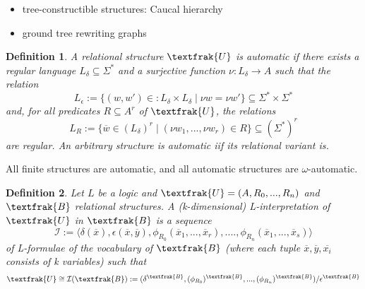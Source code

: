 \documentclass[]{article}
\newtheorem{definition}{Definition}
\newtheorem{theorem}{Theorem}
\begin{document}
\begin{itemize}
        they form a proper subclass of automatic structures that generalizes various notions of infinite graphs. Examples: context free graphs (= configuration graphs of PDA), HR- and VR-equational graphs, prefix-recognizable graphs.
        \begin{theorem}
            For any graph $G=(V,(E_a)_{a\in A})$ the followign are equivalent: 
            (1) G is tree-interpretable,
            (2) G is prefix-recognizable,
            (3) G is VR-equational,
            (4) G is the restriction to a regular set of the configuration graph of a PDA with $\epsilon$-transitions.
        \end{theorem}
    \item tree-constructible structures: Caucal hierarchy
    \item ground tree rewriting graphs 
\end{itemize}
\begin{definition}
    A relational structure $\textfrak{U}$ is automatic if there exists a regular language $L_\delta \subseteq \Sigma^*$ and a surjective function $\nu : L_\delta \rightarrow A$ such that the relation 
    \begin{equation}
        L_\epsilon := \{(w, w')\in :L_\delta \times L_\delta\;|\;\nu w = \nu w'\}\subseteq \Sigma^* \times \Sigma^*
    \end{equation}
    and, for all predicates $R\subseteq A^r$ of $\textfrak{U}$, the relations 
    \begin{equation}
        L_R := \{\overline{w}\in (L_\delta)^r\;|\;(\nu w_1,...,\nu w_r)\in R\}\subseteq (\Sigma^*)^r
    \end{equation}
    are regular. An arbitrary structure is automatic iif its relational variant is. 
\end{definition}
All finite structures are automatic, and all automatic structures are $\omega$-automatic.
\begin{definition}
    Let $L$ be a logic and $\textfrak{U}=(A, R_0,..., R_n)$ and $\textfrak{B}$ relational structures. A (k-dimensional) L-interpretation of $\textfrak{U}$ in $\textfrak{B}$ is a sequence
    \begin{equation}
        \mathcal{I} := \langle \delta(\overline{x}), \epsilon(\overline{x}, \overline{y}), \phi_{R_0}(\overline{x}_1,...,\overline{x}_r),...., \phi_{R_n}(\overline{x}_1,...,\overline{x}_s)\rangle
    \end{equation}
    of L-formulae of the vocabulary of $\textfrak{B}$ (where each tuple $\overline{x}, \overline{y}, \overline{x_i}$ consists of k variables) such that
    \begin{equation}
        \textfrak{U} \cong \mathcal{I}(\textfrak{B}) := (\delta^\textfrak{B},(\phi_{R_0})^\textfrak{B},...,(\phi_{R_n})^\textfrak{B})/\epsilon^\textfrak{B}
    \end{equation}
\end{definition}
\end{document}
